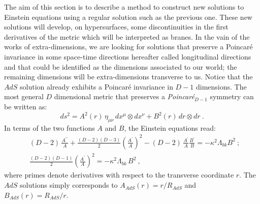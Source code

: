 \documentclass[a4paper,12pt]{article}
\def\Rads{R_{\scriptscriptstyle AdS}}
\begin{document}
The aim of this section is to describe a method to construct new solutions
to Einstein equations using a regular solution such as the previous one.
These new solutions will develop, on hypersurfaces, some discontinuities
in the first derivatives of the metric which will be interpreted as branes.
In the vain of the works of extra-dimensions, we are looking for solutions
that preserve a Poincar\'e invariance in some space-time directions hereafter
called longitudinal directions and that could be identified as the dimensions
associated to our world; the remaining dimensions will be extra-dimensions
transverse to us. Notice that the $AdS$ solution already exhibits a Poincar\'e
invariance in $D-1$ dimensions. The most general $D$ dimensional metric that
preserves a {\it Poincar\'e}$_{D-1}$ symmetry can be written as:
%
\begin{equation}
ds^2 = A^2(r)\, \eta_{\mu\nu} \, dx^\mu \otimes dx^\nu
+ B^2(r)\, dr \otimes dr
\ .
\end{equation}
%
In terms of the two functions $A$ and $B$, the Einstein equations read:
%
\begin{eqnarray}
\label{eq:Einstein1}
& \displaystyle
(D-2) \,\frac{A^{\prime\prime}}{A} +
\frac{(D-2)(D-3)}{2} \left( \frac{A^\prime}{A} \right)^2
- (D-2)\, \frac{A^\prime}{A} \frac{B^\prime}{B} =
-\kappa^2  \Lambda_{bk} B^2
\ ;\\
\label{eq:Einstein2}
& \displaystyle
\frac{(D-2)(D-1)}{2} \left( \frac{A^\prime}{A} \right)^2
=
- \kappa^2 \Lambda_{bk} \, B^2
\ ,
\end{eqnarray}
%
where  primes denote derivatives with respect to
the transverse coordinate $r$. The $AdS$ solutions simply corresponds
to $A_{AdS}(r)=r/\Rads$ and $B_{AdS}(r)=\Rads/r$.
\end{document}
